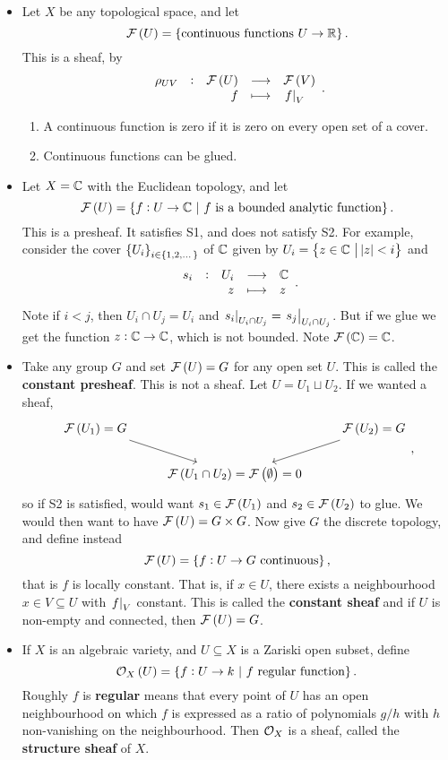 \begin{example*}
\hfill
\begin{itemize}
\item Let $ X $ be any topological space, and let
$$ \FFF\br{U} = \cbr{\text{continuous functions} \ U \to \RR}. $$
This is a sheaf, by
$$ \function[\rho_{UV}]{\FFF\br{U}}{\FFF\br{V}}{f}{\eval{f}_V}. $$
\begin{enumerate}[label=S\arabic*.]
\item A continuous function is zero if it is zero on every open set of a cover.
\item Continuous functions can be glued.
\end{enumerate}
\item Let $ X = \mathbb{C} $ with the Euclidean topology, and let
$$ \FFF\br{U} = \cbr{f : U \to \CC \st f \ \text{is a bounded analytic function}}. $$
This is a presheaf. It satisfies S1, and does not satisfy S2. For example, consider the cover $ \cbr{U_i}_{i \in \cbr{1, 2, \dots}} $ of $ \mathbb{C} $ given by $ U_i = \cbr{z \in \CC \st \abs{z} < i} $ and
$$ \function[s_i]{U_i}{\CC}{z}{z}. $$
Note if $ i < j $, then $ U_i \cap U_j = U_i $ and $ \left. s_i \right|_{U_i \cap U_j} = \left. s_j \right|_{U_i \cap U_j} $. But if we glue we get the function $ z : \mathbb{C} \to \mathbb{C} $, which is not bounded. Note $ \FFF\br{\CC} = \CC $.
\item Take any group $ G $ and set $ \FFF\br{U} = G $ for any open set $ U $. This is called the \textbf{constant presheaf}. This is not a sheaf. Let $ U = U_1 \sqcup U_2 $. If we wanted a sheaf,
$$
\begin{tikzcd}
\FFF\br{U_1} = G \arrow{dr} & & \FFF\br{U_2} = G \arrow{dl} \\
& \FFF\br{U_1 \cap U_2} = \FFF\br{\emptyset} = 0 &
\end{tikzcd},
$$
so if S2 is satisfied, would want $ s_1 \in \FFF\br{U_1} $ and $ s_2 \in \FFF\br{U_2} $ to glue. We would then want to have $ \FFF\br{U} = G \times G $. Now give $ G $ the discrete topology, and define instead
$$ \FFF\br{U} = \cbr{f : U \to G \ \text{continuous}}, $$
that is $ f $ is locally constant. That is, if $ x \in U $, there exists a neighbourhood $ x \in V \subseteq U $ with $ \left. f \right|_V $ constant. This is called the \textbf{constant sheaf} and if $ U $ is non-empty and connected, then $ \FFF\br{U} = G $.
\item If $ X $ is an algebraic variety, and $ U \subseteq X $ is a Zariski open subset, define
$$ \OOO_X\br{U} = \cbr{f : U \to k \st f \ \text{regular function}}. $$
Roughly $ f $ is \textbf{regular} means that every point of $ U $ has an open neighbourhood on which $ f $ is expressed as a ratio of polynomials $ g / h $ with $ h $ non-vanishing on the neighbourhood. Then $ \mathcal{O}_X $ is a sheaf, called the \textbf{structure sheaf} of $ X $.
\end{itemize}
\end{example*}

